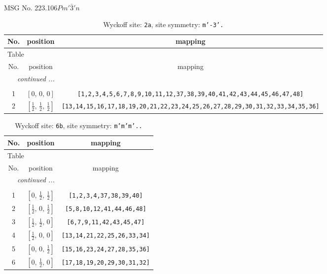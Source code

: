\documentclass[fleqn,8pt]{jsarticle}
\begin{document}
\setcounter{MaxMatrixCols}{32}

\renewcommand{\tablename}{Table~}
\renewcommand{\figurename}{Figure~}
\begin{center}
\LARGE
MSG No. 223.106\quad$Pm'\bar{3}'n$
\end{center}
\renewcommand{\arraystretch}{1.2}
\begin{longtable}{ccc}
\caption{Wyckoff site: {\tt 2a}, site symmetry: {\tt m'-3'.}}
 \\
 \hline \hline
No. & position & mapping \\ \hline \endfirsthead

\multicolumn{2}{l}{\tablename\ \thetable{}} \\
 \hline \hline
No. & position & mapping \\ \hline \endhead

 \hline \hline
\multicolumn{2}{r}{\footnotesize\it continued ...} \\ \endfoot

 \hline \hline
\multicolumn{2}{r}{} \\ \endlastfoot

1 & $\left[ 0,\, 0,\, 0 \right]$ & {\tt [1,2,3,4,5,6,7,8,9,10,11,12,37,38,39,40,41,42,43,44,45,46,47,48]} \\ \hline
2 & $\left[ \frac{1}{2},\, \frac{1}{2},\, \frac{1}{2} \right]$ & {\tt [13,14,15,16,17,18,19,20,21,22,23,24,25,26,27,28,29,30,31,32,33,34,35,36]} \\
\end{longtable}
\renewcommand{\arraystretch}{1.2}
\begin{longtable}{ccc}
\caption{Wyckoff site: {\tt 6b}, site symmetry: {\tt m'm'm'..}}
 \\
 \hline \hline
No. & position & mapping \\ \hline \endfirsthead

\multicolumn{2}{l}{\tablename\ \thetable{}} \\
 \hline \hline
No. & position & mapping \\ \hline \endhead

 \hline \hline
\multicolumn{2}{r}{\footnotesize\it continued ...} \\ \endfoot

 \hline \hline
\multicolumn{2}{r}{} \\ \endlastfoot

1 & $\left[ 0,\, \frac{1}{2},\, \frac{1}{2} \right]$ & {\tt [1,2,3,4,37,38,39,40]} \\ \hline
2 & $\left[ \frac{1}{2},\, 0,\, \frac{1}{2} \right]$ & {\tt [5,8,10,12,41,44,46,48]} \\ \hline
3 & $\left[ \frac{1}{2},\, \frac{1}{2},\, 0 \right]$ & {\tt [6,7,9,11,42,43,45,47]} \\ \hline
4 & $\left[ \frac{1}{2},\, 0,\, 0 \right]$ & {\tt [13,14,21,22,25,26,33,34]} \\ \hline
5 & $\left[ 0,\, 0,\, \frac{1}{2} \right]$ & {\tt [15,16,23,24,27,28,35,36]} \\ \hline
6 & $\left[ 0,\, \frac{1}{2},\, 0 \right]$ & {\tt [17,18,19,20,29,30,31,32]} \\
\end{longtable}
\end{document}
